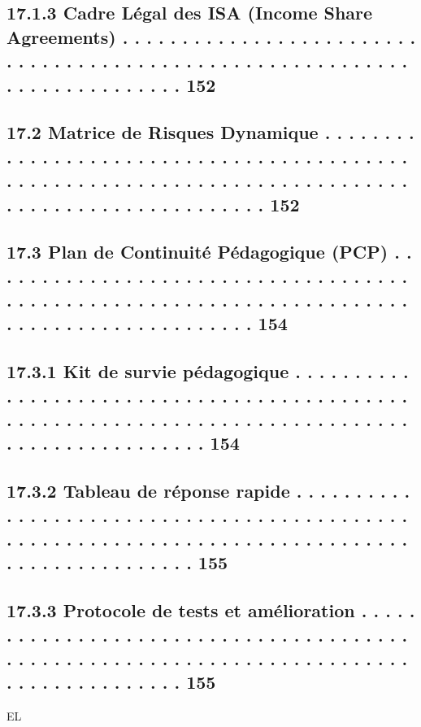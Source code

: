 \documentclass[12pt,landscape,a4paper]{article}
\begin{document}
\subsection{17.1.3            Cadre Légal des ISA (Income Share Agreements) . . . . . . . . . . . . . . . . . . . . . . . . . . . . . . . . . . . . . . . . . . . . . . . . . . . . . . . . . . . . . . . . . . . . . . . . . . 152}
\subsection{17.2    Matrice de Risques Dynamique . . . . . . . . . . . . . . . . . . . . . . . . . . . . . . . . . . . . . . . . . . . . . . . . . . . . . . . . . . . . . . . . . . . . . . . . . . . . . . . . . . . . . . . . . . . . . . . . . . 152}
\subsection{17.3    Plan de Continuité Pédagogique (PCP) . . . . . . . . . . . . . . . . . . . . . . . . . . . . . . . . . . . . . . . . . . . . . . . . . . . . . . . . . . . . . . . . . . . . . . . . . . . . . . . . . . . . . . . . . . . 154}
\subsection{17.3.1            Kit de survie pédagogique . . . . . . . . . . . . . . . . . . . . . . . . . . . . . . . . . . . . . . . . . . . . . . . . . . . . . . . . . . . . . . . . . . . . . . . . . . . . . . . . . . . . . . . . . . . . . . . 154}
\subsection{17.3.2            Tableau de réponse rapide . . . . . . . . . . . . . . . . . . . . . . . . . . . . . . . . . . . . . . . . . . . . . . . . . . . . . . . . . . . . . . . . . . . . . . . . . . . . . . . . . . . . . . . . . . . . . . 155}
\subsection{17.3.3            Protocole de tests et amélioration . . . . . . . . . . . . . . . . . . . . . . . . . . . . . . . . . . . . . . . . . . . . . . . . . . . . . . . . . . . . . . . . . . . . . . . . . . . . . . . . . . . . . . . . 155}
\vspace{0.5em}
\vspace{0.5em}
\vspace{0.5em}
\vspace{0.5em}
EL\\
\end{document}
